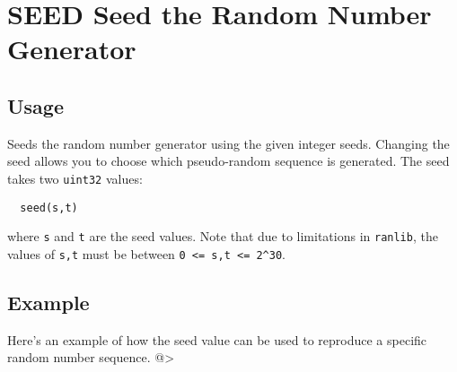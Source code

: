 \section{SEED Seed the Random Number Generator}

\subsection{Usage}

Seeds the random number generator using the given integer seeds.  
Changing the seed allows you to choose which pseudo-random
sequence is generated.  The seed takes two \verb|uint32| values:
\begin{verbatim}
  seed(s,t)
\end{verbatim}
where \verb|s| and \verb|t| are the seed values.  Note that due to limitations
in \verb|ranlib|, the values of \verb|s,t| must be between \verb|0 <= s,t <= 2^30|.
\subsection{Example}

Here's an example of how the seed value can be used to reproduce
a specific random number sequence.
@>
